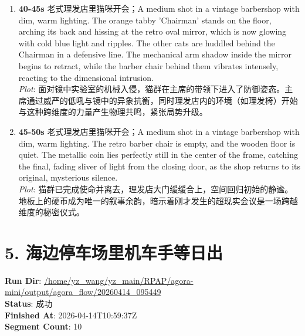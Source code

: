 \documentclass[11pt,a4paper]{article}
\begin{document}
\begin{enumerate}
\item \textbf{40-45s} 老式理发店里猫咪开会；A medium shot in a vintage barbershop with dim, warm lighting. The orange tabby 'Chairman' stands on the floor, arching its back and hissing at the retro oval mirror, which is now glowing with cold blue light and ripples. The other cats are huddled behind the Chairman in a defensive line. The mechanical arm shadow inside the mirror begins to retract, while the barber chair behind them vibrates intensely, reacting to the dimensional intrusion.\\\newline \textit{Plot}: 面对镜中实验室的机械入侵，猫群在主席的带领下进入了防御姿态。主席通过威严的低吼与镜中的异象抗衡，同时理发店内的环境（如理发椅）开始与这种跨维度的力量产生物理共鸣，紧张局势升级。
\item \textbf{45-50s} 老式理发店里猫咪开会；A medium shot in a vintage barbershop with dim, warm lighting. The retro barber chair is empty, and the wooden floor is quiet. The metallic coin lies perfectly still in the center of the frame, catching the final, fading sliver of light from the closing door, as the shop returns to its original, mysterious silence.\\\newline \textit{Plot}: 猫群已完成使命并离去，理发店大门缓缓合上，空间回归初始的静谧。地板上的硬币成为唯一的叙事余韵，暗示着刚才发生的超现实会议是一场跨越维度的秘密仪式。
\end{enumerate}

\section{5. 海边停车场里机车手等日出}
\textbf{Run Dir}: \url{/home/yz\_wang/yz\_main/RPAP/agora-mini/output/agora\_flow/20260414\_095449}\\
\textbf{Status}: 成功\\
\textbf{Finished At}: 2026-04-14T10:59:37Z\\
\textbf{Segment Count}: 10
\end{document}
